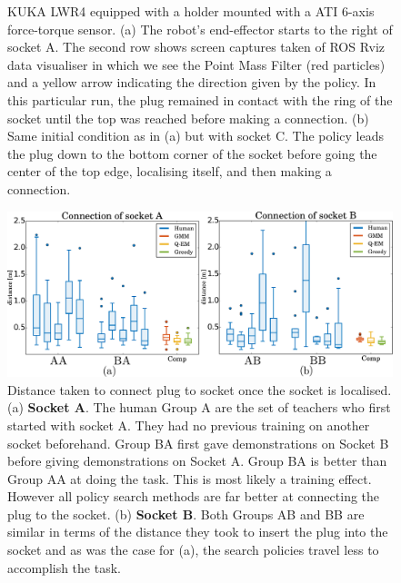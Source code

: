 \begin{figure}
 \centering
 \caption{KUKA LWR4 equipped with a holder mounted with a ATI 6-axis force-torque sensor. (a) The robot's end-effector starts to the 
 right of socket A. The second row shows screen captures taken of ROS Rviz data visualiser in which we see the Point Mass Filter 
 (red particles) and a yellow arrow indicating the direction given by the policy. In this particular run, the plug remained in contact with the ring of the socket until 
 the top was reached before making a connection. (b) Same initial condition as in (a) but with socket C. The policy leads the plug down to 
 the bottom corner of the socket before going the center of the top edge, localising itself, and then making a connection.}
 \label{fig:real_pictures}
\end{figure}

\begin{figure}
 \centering
   \includegraphics[width=\textwidth]{./ch4-PiH/Figures/Results2/real_exp_socketAB.pdf}
  \caption{Distance taken to connect plug to socket once the socket is localised. (a) \textbf{Socket A}. The human 
  Group A are the set of teachers who first started with socket A. They had no previous training on another socket beforehand. Group 
  BA first gave demonstrations on Socket B before giving demonstrations on Socket A. Group BA
  is better than Group AA at doing the task. This is most likely a training effect. However all policy search methods are far better
  at connecting the plug to the socket. (b) \textbf{Socket B}. Both Groups AB and BB are similar in terms 
  of the distance they took to insert the plug into the socket and as was the case for (a), the search policies travel less to accomplish 
  the task.   } 
  \label{fig:real_statistics}
\end{figure}

